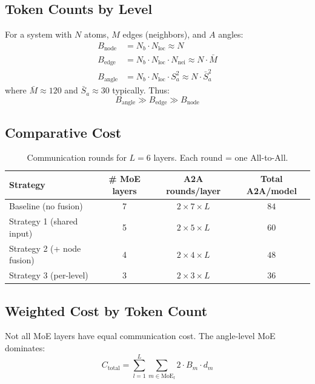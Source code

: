 \documentclass[11pt,a4paper]{article}
\begin{document}
\subsection{Token Counts by Level}

For a system with $N$ atoms, $M$ edges (neighbors), and $A$ angles:
\begin{align}
    B_{\text{node}} &= N_b \cdot N_{\text{loc}} \approx N \\
    B_{\text{edge}} &= N_b \cdot N_{\text{loc}} \cdot N_{\text{nei}} \approx N \cdot \bar{M} \\
    B_{\text{angle}} &= N_b \cdot N_{\text{loc}} \cdot S_a^2 \approx N \cdot \bar{S}_a^2
\end{align}
where $\bar{M} \approx 120$ and $\bar{S}_a \approx 30$ typically. Thus:
\begin{equation}
    B_{\text{angle}} \gg B_{\text{edge}} \gg B_{\text{node}}
\end{equation}

\subsection{Comparative Cost}

\begin{table}[h]
\centering
\begin{tabular}{lccc}
\toprule
Strategy & \# MoE layers & A2A rounds/layer & Total A2A/model \\
\midrule
Baseline (no fusion) & 7 & $2 \times 7 \times L$ & $84$ \\
Strategy 1 (shared input) & 5 & $2 \times 5 \times L$ & $60$ \\
Strategy 2 (+ node fusion) & 4 & $2 \times 4 \times L$ & $48$ \\
Strategy 3 (per-level) & 3 & $2 \times 3 \times L$ & $36$ \\
\bottomrule
\end{tabular}
\caption{Communication rounds for $L=6$ layers. Each round = one All-to-All.}
\end{table}

\subsection{Weighted Cost by Token Count}

Not all MoE layers have equal communication cost. The angle-level MoE dominates:
\begin{equation}
    C_{\text{total}} = \sum_{l=1}^{L} \sum_{m \in \text{MoE}_l} 2 \cdot B_m \cdot d_m
\end{equation}
\end{document}
